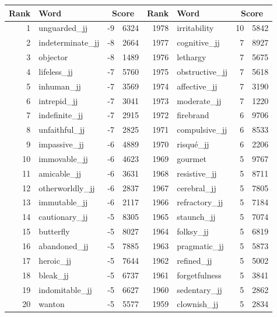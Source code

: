 \begin{table}[tbp]
    \begin{tabular}{| rlr@{.}l | rlr@{.}l |}
    \hline
    \textbf{Rank} & \textbf{Word} & \multicolumn{2}{c|}{\textbf{Score}} & \textbf{Rank} & \textbf{Word} & \multicolumn{2}{c|}{\textbf{Score}} \\
    \hline
    1 & unguarded\_jj & -9 & 6324    &    1978 & irritability & 10 & 5842 \\
    2 & indeterminate\_jj & -8 & 2664    &    1977 & cognitive\_jj & 7 & 8927 \\
    3 & objector & -8 & 1489    &    1976 & lethargy & 7 & 5675 \\
    4 & lifeless\_jj & -7 & 5760    &    1975 & obstructive\_jj & 7 & 5618 \\
    5 & inhuman\_jj & -7 & 3569    &    1974 & affective\_jj & 7 & 3190 \\
    6 & intrepid\_jj & -7 & 3041    &    1973 & moderate\_jj & 7 & 1220 \\
    7 & indefinite\_jj & -7 & 2915    &    1972 & firebrand & 6 & 9706 \\
    8 & unfaithful\_jj & -7 & 2825    &    1971 & compulsive\_jj & 6 & 8533 \\
    9 & impassive\_jj & -6 & 4889    &    1970 & risqué\_jj & 6 & 2206 \\
    10 & immovable\_jj & -6 & 4623    &    1969 & gourmet & 5 & 9767 \\
    11 & amicable\_jj & -6 & 3631    &    1968 & resistive\_jj & 5 & 8711 \\
    12 & otherworldly\_jj & -6 & 2837    &    1967 & cerebral\_jj & 5 & 7805 \\
    13 & immutable\_jj & -6 & 2117    &    1966 & refractory\_jj & 5 & 7184 \\
    14 & cautionary\_jj & -5 & 8305    &    1965 & staunch\_jj & 5 & 7074 \\
    15 & butterfly & -5 & 8027    &    1964 & folksy\_jj & 5 & 6819 \\
    16 & abandoned\_jj & -5 & 7885    &    1963 & pragmatic\_jj & 5 & 5873 \\
    17 & heroic\_jj & -5 & 7644    &    1962 & refined\_jj & 5 & 5002 \\
    18 & bleak\_jj & -5 & 6737    &    1961 & forgetfulness & 5 & 3841 \\
    19 & indomitable\_jj & -5 & 6627    &    1960 & sedentary\_jj & 5 & 2862 \\
    20 & wanton & -5 & 5577    &    1959 & clownish\_jj & 5 & 2834 \\

\end{tabular}
\end{table}
